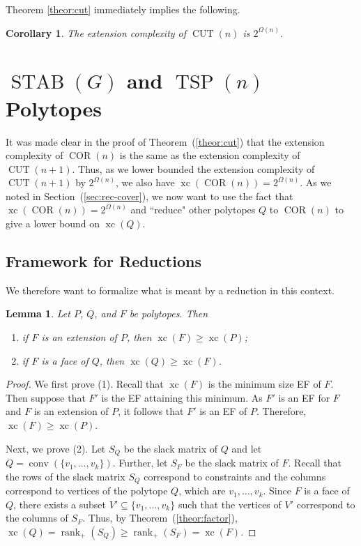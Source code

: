 \documentclass{article}
\newtheorem{lemma}[theorem]{\sc Lemma}
\newtheorem{corollary}[theorem]{\sc Corollary}
\theoremstyle{definition}
\theoremstyle{remark}
\newcommand{\nrank}{\operatorname{rank}_+}
\newcommand{\conv}{\operatorname{conv}}
\newcommand{\xc}{\operatorname{xc}}
\newcommand{\TSP}{\operatorname{TSP}}
\newcommand{\STAB}{\operatorname{STAB}}
\newcommand{\CUT}{\operatorname{CUT}}
\newcommand{\COR}{\operatorname{COR}}
\begin{document}
Theorem \ref{theor:cut} immediately implies the following.

\begin{corollary}\label{cor:cut}
The extension complexity of $\CUT(n)$ is $2^{\Omega(n)}$.
\end{corollary}

\section{$\STAB(G)$ and $\TSP(n)$ Polytopes}

It was made clear in the proof of Theorem~(\ref{theor:cut}) that the extension complexity of $\COR(n)$ is the same as the extension complexity of $\CUT(n+1)$. Thus, as we lower bounded the extension complexity of $\CUT(n+1)$ by $2^{\Omega(n)}$, we also have $\xc(\COR(n)) = 2^{\Omega(n)}$. As we noted in Section~(\ref{sec:rec-cover}), we now want to use the fact that $\xc(\COR(n)) = 2^{\Omega(n)}$ and ``reduce" other polytopes $Q$ to $\COR(n)$ to give a lower bound on $\xc(Q)$.

\subsection{Framework for Reductions}\label{sec:reduct}

We therefore want to formalize what is meant by a reduction in this context.

\begin{lemma}\label{lem:reduct}
Let $P$, $Q$, and $F$ be polytopes. Then
\begin{enumerate} \itemsep0pt
\item if $F$ is an extension of $P$, then $\xc(F) \ge \xc(P)$;
\item if $F$ is a face of $Q$, then $\xc(Q) \ge \xc(F)$.
\end{enumerate}
\end{lemma}
\begin{proof}
We first prove (1). Recall that $\xc(F)$ is the minimum size EF of $F$. Then suppose that $F'$ is the EF attaining this minimum. As $F'$ is an EF for $F$ and $F$ is an extension of $P$, it follows that $F'$ is an EF of $P$. Therefore, $\xc(F) \ge \xc(P)$. 

Next, we prove (2). Let $S_Q$ be the slack matrix of $Q$ and let $Q = \conv(\{v_1, \ldots, v_k\})$. Further, let $S_F$ be the slack matrix of $F$. Recall that the rows of the slack matrix $S_Q$ correspond to constraints and the columns correspond to vertices of the polytope $Q$, which are $v_1, \ldots, v_k$. Since $F$ is a face of $Q$, there exists a subset $V' \subseteq \{v_1, \ldots, v_k\}$ such that the vertices of $V'$ correspond to the columns of $S_F$. Thus, by Theorem~(\ref{theor:factor}), $\xc(Q) = \nrank(S_Q) \ge \nrank(S_F) = \xc(F)$.
\end{proof}
\end{document}
